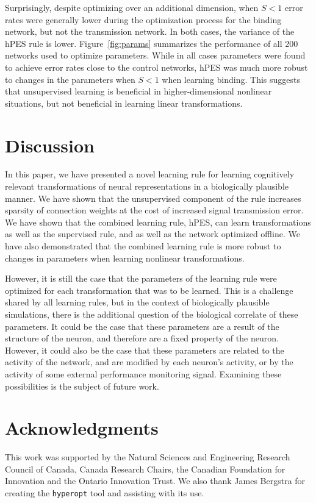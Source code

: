 \documentclass[10pt,letterpaper]{article}
\begin{document}
Surprisingly, despite optimizing over an additional dimension,
when $S < 1$ error rates were
generally lower during the optimization process
for the binding network, but not the transmission network.
In both cases, the variance of the hPES rule is lower.
Figure~\ref{fig:params} summarizes the performance of
all 200 networks used to optimize parameters.
While in all cases parameters were found to achieve
error rates close to the control networks,
hPES was much more robust to changes
in the parameters when $S < 1$ when learning binding.
This suggests that unsupervised learning
is beneficial in higher-dimensional nonlinear situations,
but not beneficial in learning linear transformations.

\section{Discussion}

In this paper, we have presented a novel learning rule
for learning cognitively relevant transformations
of neural representations
in a biologically plausible manner.
We have shown that the unsupervised component of the rule
increases sparsity of connection weights
at the cost of increased signal transmission error.
We have shown that the combined learning rule, hPES,
can learn transformations as well as the supervised rule,
and as well as the network optimized offline.
We have also demonstrated that the combined learning rule
is more robust to changes in parameters
when learning nonlinear transformations.

However, it is still the case that
the parameters of the learning rule
were optimized for each transformation
that was to be learned.
This is a challenge shared by all learning rules,
but in the context of biologically plausible simulations,
there is the additional question of
the biological correlate of these parameters.
It could be the case that these parameters
are a result of the structure of the neuron,
and therefore are a fixed property of the neuron.
However, it could also be the case that
these parameters are related to the activity of the network,
and are modified by each neuron's activity,
or by the activity of some external
performance monitoring signal.
Examining these possibilities is the subject
of future work.

\section{Acknowledgments}

This work was supported by the Natural Sciences
and Engineering Research Council of Canada,
Canada Research Chairs,
the Canadian Foundation for Innovation
and the Ontario Innovation Trust.
We also thank James Bergstra for creating
the \texttt{hyperopt} tool and assisting
with its use.



\setlength{\bibleftmargin}{.125in}
\setlength{\bibindent}{-\bibleftmargin}


\end{document}
